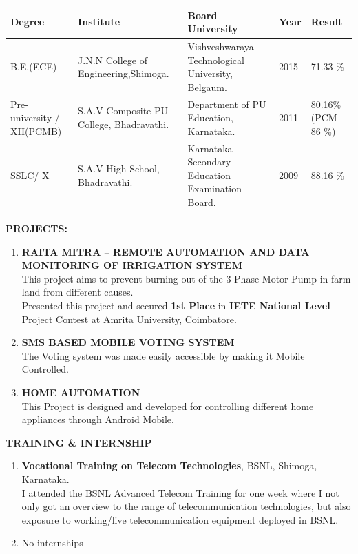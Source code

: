 \documentclass{article}
\begin{document}
	\begin{tabular}{|p{2cm}|p{5cm}|p{5cm}|p{1cm}|p{2cm}|}
		\hline 
		\textbf{  Degree } & \textbf{ Institute} & \textbf{   Board University} & \textbf{Year} & \textbf{Result}\\ [0.5ex] 
		\hline 
		B.E.(ECE) & J.N.N College of Engineering,\hspace{1cm}Shimoga. & Vishveshwaraya Technological\hspace{.5cm} University, Belgaum. & 2015 & 71.33 \% \\
		\hline 
		Pre-university / XII(PCMB) &S.A.V Composite PU College, Bhadravathi. & Department of PU Education,	\hspace{.5cm} Karnataka. & 2011 & 80.16\% \hspace{1cm} (PCM 86 \%)	\\
		\hline 
		SSLC/ X & S.A.V High School, Bhadravathi. &Karnataka Secondary Education Examination Board. & 2009 & 	88.16 \%  \\				 
		\hline
	\end{tabular}
\newline \newline
\newline
\textbf{PROJECTS:}
\begin{enumerate}
	\item  \textbf{RAITA MITRA $$ REMOTE AUTOMATION AND DATA MONITORING OF IRRIGATION
		SYSTEM}\\
			 This project aims to prevent burning out of the 3 Phase Motor Pump in farm land from different causes.\\
			 Presented this project and secured \textbf{1st Place} in \textbf{ IETE National Level} Project
			 Contest at Amrita University, Coimbatore.
			
			 \item \textbf{SMS BASED MOBILE VOTING SYSTEM}\\
			 The Voting system was made easily accessible by making it Mobile
			 Controlled.
			 
			 \item \textbf{HOME AUTOMATION}\\
			 This Project is designed and developed for controlling different home appliances through Android Mobile.
			 
\end{enumerate}
\textbf{TRAINING \& INTERNSHIP}
\begin{enumerate}
		\item \textbf{Vocational Training on Telecom Technologies}, BSNL, Shimoga, Karnataka.\\
		I attended the BSNL Advanced Telecom Training for one week where I not only got an overview to the range of telecommunication technologies, but also exposure to
		working/live telecommunication equipment deployed in BSNL.
		\item No internships\\	
\end{enumerate}
\end{document}

